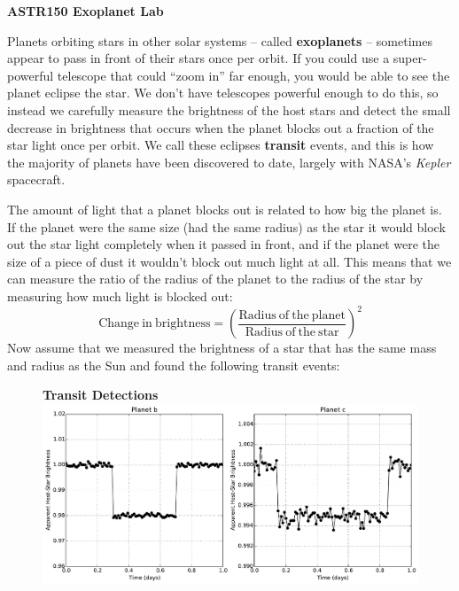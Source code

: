 \documentclass[12pt]{article}
\begin{document}

\begin{center}
\bf ASTR150 Exoplanet Lab
\end{center}

Planets orbiting stars in other solar systems -- called {\bf exoplanets} -- sometimes appear to pass in front of their stars once per orbit. If you could use a super-powerful telescope that could ``zoom in'' far enough, you would be able to see the planet eclipse the star. We don't have telescopes powerful enough to do this, so instead we carefully measure the brightness of the host stars and detect the small decrease in brightness that occurs when the planet blocks out a fraction of the star light once per orbit.  We call these eclipses {\bf transit} events, and this is how the majority of planets have been discovered to date, largely with NASA's {\it Kepler} spacecraft. 

The amount of light that a planet blocks out is related to how big the planet is. If the planet were the same size (had the same radius) as the star it would block out the star light completely when it passed in front, and if the planet were the size of a piece of dust it wouldn't block out much light at all. This means that we can measure the ratio of the radius of the planet to the radius of the star by measuring how much light is blocked out: 
\begin{equation}
\mathrm{Change~in~brightness} = \left( \frac{\mathrm{Radius~of~the~planet}}{\mathrm{Radius~of~the~star}} \right)^2 \label{eqn:depth}
\end{equation}
Now assume that we measured the brightness of a star that has the same mass and radius as the Sun and found the following transit events:
\begin{figure}[h!]
\centering
{\bf Transit Detections} \\
\includegraphics[scale=0.5]{plots/faketransit.pdf}
\end{figure}
\end{document}
